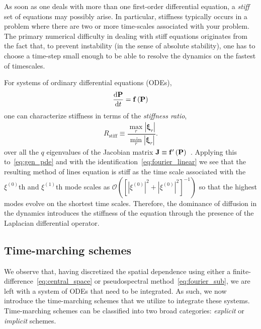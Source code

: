 \documentclass[11pt]{article}
\begin{document}
As soon as one deals with more than one first-order differential equation, a \emph{stiff} set of equations may possibly arise. In particular, stiffness typically occurs in a problem where there are two or more time-scales associated with your problem. The primary numerical difficulty in dealing with stiff equations originates from the fact that, to prevent instability (in the sense of absolute stability), one has to choose a time-step small enough to be able to resolve the dynamics on the fastest of timescales. 

For systems of ordinary differential equations (ODEs), 
\begin{align}
    \dv{\vb{P}}{t} = \vb{f}\left(\vb{P}\right)
\end{align}
one can characterize stiffness in terms of the \emph{stiffness ratio},
\begin{align}
    R_{\mathrm{stiff}} \equiv \dfrac{\max\limits_{r}|\bm{\xi}_{r}|}{\min\limits_{r}|\bm{\xi}_{r}|}.
\end{align}
over all the $q$ eigenvalues of the Jacobian matrix $\vb{J}\equiv \vb{f}^{\prime}\left(\vb{P}\right)$~\cite{leveque2007finite}. Applying this to~\eqref{eq:gen_pde} and with the identification~\eqref{eq:fourier_linear} we see that the resulting method of lines equation is stiff as the time scale associated with the $\xi^{(0)}$th and $\xi^{(1)}$th mode scales as $\mathcal{O}\left(\left[|\xi^{(0)}|^{2}+|\xi^{(0)}|^{2}\right]^{-1}\right)$ so that the highest modes evolve on the shortest time scales. Therefore, the dominance of diffusion in the dynamics introduces the stiffness of the equation through the presence of the Laplacian differential operator. 

\subsection{Time-marching schemes}

We observe that, having discretized the spatial dependence using either a finite-difference~\eqref{eq:central_space} or pseudospectral method~\eqref{eq:fourier_sub}, we are left with a system of ODEs that need to be integrated. As such, we now introduce the time-marching schemes that we utilize to integrate these systems. Time-marching schemes can be classified into two broad categories: \emph{explicit} or \emph{implicit} schemes. 
\end{document}
